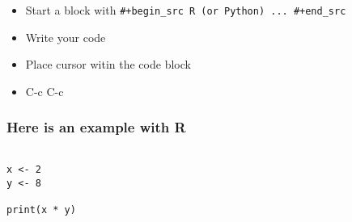 \documentclass[11pt]{article}
\begin{document}
\begin{itemize}
\item Start a block with \texttt{\#+begin\_src R (or Python) ... \#+end\_src}
\item Write your code
\item Place cursor witin the code block
\item C-c C-c
\end{itemize}

\subsubsection{Here is an example with R}
\label{sec:org49f0b92}

\begin{verbatim}

x <- 2
y <- 8

print(x * y)

\end{verbatim}
\end{document}
